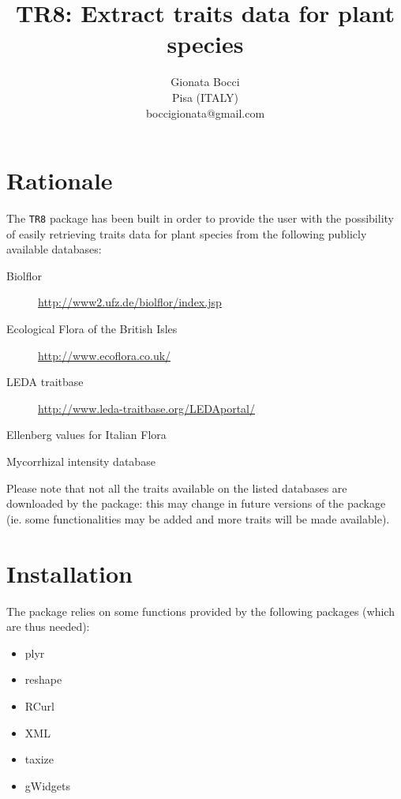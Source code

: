 \documentclass{article}
\title{TR8: Extract traits data for plant species}
\author{Gionata Bocci\\Pisa (ITALY)\\ {boccigionata@gmail.com}}
\begin{document}
\maketitle



\section{Rationale}
\label{sec:rationale}

The \texttt{TR8} package has been built in order to provide the user with the
possibility of easily retrieving traits data for plant species from the following publicly available databases:

\begin{description}
\item[Biolflor] \url{http://www2.ufz.de/biolflor/index.jsp} \cite{biolflor}
\item[Ecological Flora of the British Isles] \url{http://www.ecoflora.co.uk/} \cite{ecoflora}
\item[LEDA traitbase] \url{http://www.leda-traitbase.org/LEDAportal/} \cite{leda}
\item[Ellenberg values for Italian Flora] \cite{pignatti}
\item[Mycorrhizal intensity database] \cite{amf}
\end{description}

  Please note that not all the traits available on the listed
  databases are downloaded by the package: this may change in future
  versions of the package (ie. some functionalities may be added and
  more traits will be made available).

\section{Installation}
\label{sec:installation}

 The package relies on some functions provided by the following packages (which are thus needed):
 \begin{itemize}
  \item plyr\cite{plyr}
  \item reshape\cite{reshape}
  \item RCurl\cite{RCurl}
  \item XML\cite{XML}
  \item taxize\cite{taxize}
  \item gWidgets\cite{gWidgets}
  \end{itemize}
  
\end{document}
